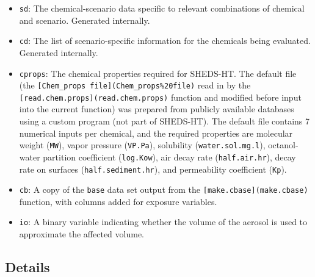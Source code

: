 \documentclass[
]{article}
\providecommand{\tightlist}{%
  \setlength{\itemsep}{0pt}\setlength{\parskip}{0pt}}
\begin{document}
\begin{itemize}
\tightlist
\item
  \texttt{sd}: The chemical-scenario data specific to relevant
  combinations of chemical and scenario. Generated internally.
\item
  \texttt{cd}: The list of scenario-specific information for the
  chemicals being evaluated. Generated internally.
\item
  \texttt{cprops}: The chemical properties required for SHEDS-HT. The
  default file (the
  \texttt{{[}Chem\_props\ file{]}(Chem\_props\%20file)} read in by the
  \texttt{{[}read.chem.props{]}(read.chem.props)} function and modified
  before input into the current function) was prepared from publicly
  available databases using a custom program (not part of SHEDS-HT). The
  default file contains 7 numerical inputs per chemical, and the
  required properties are molecular weight (\texttt{MW}), vapor pressure
  (\texttt{VP.Pa}), solubility (\texttt{water.sol.mg.l}), octanol-water
  partition coefficient (\texttt{log.Kow}), air decay rate
  (\texttt{half.air.hr}), decay rate on surfaces
  (\texttt{half.sediment.hr}), and permeability coefficient
  (\texttt{Kp}).
\item
  \texttt{cb}: A copy of the \texttt{base} data set output from the
  \texttt{{[}make.cbase{]}(make.cbase)} function, with columns added for
  exposure variables.
\item
  \texttt{io}: A binary variable indicating whether the volume of the
  aerosol is used to approximate the affected volume.
\end{itemize}

\hypertarget{details-11}{%
\subsection{Details}\label{details-11}}
\end{document}
